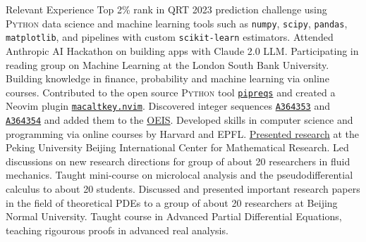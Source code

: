 

\begin{rubric}{Relevant Experience}
  \entry*[2023\myhori{} ] Top 2\% rank in QRT 2023 prediction challenge using \textsc{Python} data science and machine learning tools such as \texttt{numpy}, \texttt{scipy}, \texttt{pandas}, \texttt{matplotlib}, and pipelines with custom \texttt{scikit-learn} estimators.
  \entry*[2023\myhori{} ] Attended Anthropic AI Hackathon on building apps with Claude 2.0 LLM.
  \entry*[2023\myhori{} ] Participating in reading group on Machine Learning at the London South Bank University.
  \entry*[2023\myhori{} ] Building knowledge in finance, probability and machine learning via online courses.
  \entry*[2023\myhori{} ] Contributed to the open source \textsc{Python} tool \href{https://github.com/bndr/pipreqs}{\texttt{pipreqs}} and created a Neovim plugin \href{https://github.com/clvnkhr/macaltkey.nvim}{\texttt{macaltkey.nvim}}.
  \entry*[2023\myhori{} ] Discovered integer sequences \href{https://oeis.org/A364353}{\texttt{A364353}} and \href{https://oeis.org/A364354}{\texttt{A364354}} and added them to the \href{https://oeis.org/A364354}{\textsc{OEIS}}.
  \entry*[2022\myhori{} ] Developed skills in computer science and programming via online courses by Harvard and EPFL. 
  \entry*[2022\myhori{} ] \href{https://bicmr.pku.edu.cn/cn/content/show/46-2688.html}{Presented research} at the Peking University Beijing International Center for Mathematical Research. 
  \entry*[2021\myhori{} ]Led discussions on new research directions for group of about 20 researchers in fluid mechanics. 
  \entry*[2020\myhori{} ] Taught mini-course on microlocal analysis and the pseudodifferential calculus to about 20 students.
  \entry*[2020\myhori{} ] Discussed and presented important research papers in the field of theoretical PDEs to a group of about 20 researchers at Beijing Normal University.
  \entry*[2019\myhori{} ] Taught course in Advanced Partial Differential Equations, teaching rigourous proofs in advanced real analysis.
%


\end{rubric}
